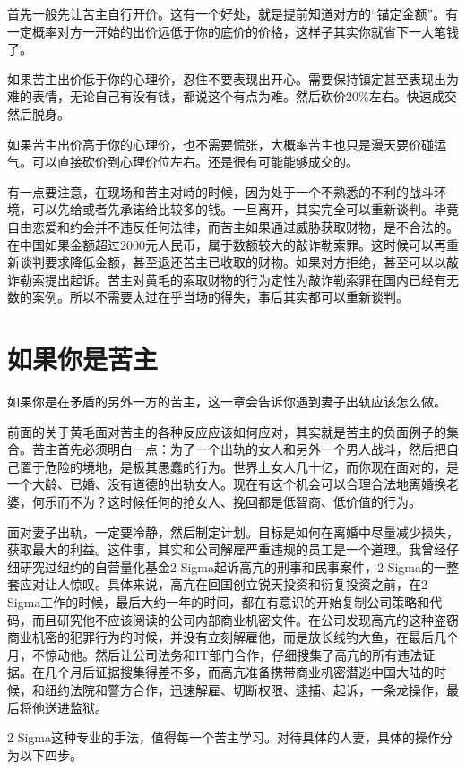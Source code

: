 首先一般先让苦主自行开价。这有一个好处，就是提前知道对方的``锚定金额''。有一定概率对方一开始的出价远低于你的底价的价格，这样子其实你就省下一大笔钱了。

如果苦主出价低于你的心理价，忍住不要表现出开心。需要保持镇定甚至表现出为难的表情，无论自己有没有钱，都说这个有点为难。然后砍价20\%左右。快速成交然后脱身。

如果苦主出价高于你的心理价，也不需要慌张，大概率苦主也只是漫天要价碰运气。可以直接砍价到心理价位左右。还是很有可能能够成交的。

有一点要注意，在现场和苦主对峙的时候，因为处于一个不熟悉的不利的战斗环境，可以先给或者先承诺给比较多的钱。一旦离开，其实完全可以重新谈判。毕竟自由恋爱和约会并不违反任何法律，而苦主如果通过威胁获取财物，是不合法的。在中国如果金额超过2000元人民币，属于数额较大的敲诈勒索罪。这时候可以再重新谈判要求降低金额，甚至退还苦主已收取的财物。如果对方拒绝，甚至可以以敲诈勒索提出起诉。苦主对黄毛的索取财物的行为定性为敲诈勒索罪在国内已经有无数的案例。所以不需要太过在乎当场的得失，事后其实都可以重新谈判。

\section{如果你是苦主}

如果你是在矛盾的另外一方的苦主，这一章会告诉你遇到妻子出轨应该怎么做。

前面的关于黄毛面对苦主的各种反应应该如何应对，其实就是苦主的负面例子的集合。苦主首先必须明白一点：为了一个出轨的女人和另外一个男人战斗，然后把自己置于危险的境地，是极其愚蠢的行为。世界上女人几十亿，而你现在面对的，是一个大龄、已婚、没有道德的出轨女人。现在有这个机会可以合理合法地离婚换老婆，何乐而不为？这时候任何的抢女人、挽回都是低智商、低价值的行为。

面对妻子出轨，一定要冷静，然后制定计划。目标是如何在离婚中尽量减少损失，获取最大的利益。这件事，其实和公司解雇严重违规的员工是一个道理。我曾经仔细研究过纽约的自营量化基金2 Sigma起诉高亢的刑事和民事案件，2 Sigma的一整套应对让人惊叹。具体来说，高亢在回国创立锐天投资和衍复投资之前，在2 Sigma工作的时候，最后大约一年的时间，都在有意识的开始复制公司策略和代码，而且研究他不应该阅读的公司内部商业机密文件。在公司发现高亢的这种盗窃商业机密的犯罪行为的时候，并没有立刻解雇他，而是放长线钓大鱼，在最后几个月，不惊动他。然后让公司法务和IT部门合作，仔细搜集了高亢的所有违法证据。在几个月后证据搜集得差不多，而高亢准备携带商业机密潜逃中国大陆的时候，和纽约法院和警方合作，迅速解雇、切断权限、逮捕、起诉，一条龙操作，最后将他送进监狱。

2 Sigma这种专业的手法，值得每一个苦主学习。对待具体的人妻，具体的操作分为以下四步。

